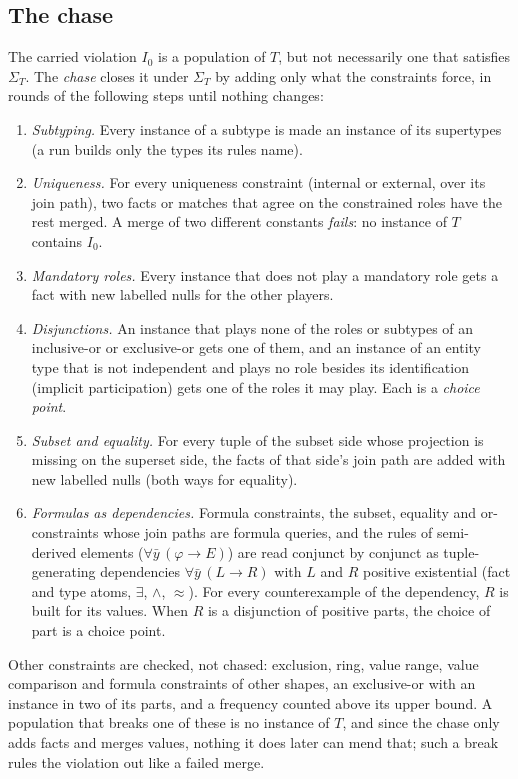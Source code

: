 \documentclass[11pt]{amsart}
\theoremstyle{definition}
\theoremstyle{remark}
\newcommand{\dataEq}{\mathrel{\approx}}
\begin{document}
\subsection{The chase}

The carried violation $I_0$ is a population of $T$, but not necessarily one
that satisfies $\Sigma_T$. The \emph{chase} closes it under $\Sigma_T$ by
adding only what the constraints force, in rounds of the following steps
until nothing changes:
\begin{enumerate}
  \item \emph{Subtyping.} Every instance of a subtype is made an instance
    of its supertypes (a run builds only the types its rules name).
  \item \emph{Uniqueness.} For every uniqueness constraint (internal or
    external, over its join path), two facts or matches that agree on the
    constrained roles have the rest merged. A merge of two different
    constants \emph{fails}: no instance of $T$ contains $I_0$.
  \item \emph{Mandatory roles.} Every instance that does not play a
    mandatory role gets a fact with new labelled nulls for the other
    players.
  \item \emph{Disjunctions.} An instance that plays none of the roles or
    subtypes of an inclusive-or or exclusive-or gets one of them, and an
    instance of an entity type that is not independent and plays no role
    besides its identification (implicit participation) gets one of the
    roles it may play. Each is a \emph{choice point}.
  \item \emph{Subset and equality.} For every tuple of the subset side
    whose projection is missing on the superset side, the facts of that
    side's join path are added with new labelled nulls (both ways for
    equality).
  \item \emph{Formulas as dependencies.} Formula constraints, the
    subset, equality and or-constraints whose join paths are formula
    queries, and the rules of semi-derived elements ($\forall \bar y\,
    (\varphi \to E)$) are read conjunct by conjunct as tuple-generating
    dependencies $\forall \bar y\, (L \to R)$ with $L$ and $R$ positive
    existential (fact and type atoms, $\exists$, $\wedge$, $\dataEq$).
    For every counterexample of the dependency, $R$ is built for its
    values. When $R$ is a disjunction of positive parts, the choice of
    part is a choice point.
\end{enumerate}
Other constraints are checked, not chased: exclusion, ring, value range,
value comparison and formula constraints of other shapes, an exclusive-or
with an instance in two of its parts, and a frequency counted above its
upper bound. A population that breaks one of these is no instance of $T$,
and since the chase only adds facts and merges values, nothing it does
later can mend that; such a break rules the violation out like a failed
merge.
\end{document}
